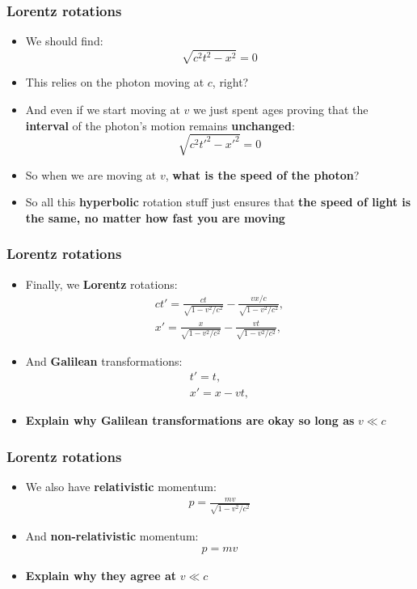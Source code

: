 \documentclass{beamer}
\begin{document}
\begin{frame}
  \frametitle{Lorentz rotations}
  \begin{itemize}
    \item<1-> We should find:
      \begin{equation*}
	\sqrt{c^2t^2-x^2}=0
      \end{equation*}
    \item<2-> This relies on the photon moving at $c$, right?
    \item<3-> And even if we start moving at $v$ we just spent ages proving that the \textbf{interval} of the photon's motion remains \textbf{unchanged}:
      \begin{equation*}
	\sqrt{c^2t'^2-x'^2}=0
      \end{equation*}
    \item<4-> So when we are moving at $v$, \textbf{what is the speed of the photon}?
    \item<5-> So all this \textbf{hyperbolic} rotation stuff just ensures that \textbf{the speed of light is the same, no matter how fast you are moving}
  \end{itemize}
\end{frame}

\begin{frame}
  \frametitle{Lorentz rotations}
  \begin{itemize}
    \item<1-> Finally, we \textbf{Lorentz} rotations:
      \begin{gather*}
	ct'=\frac{ct}{\sqrt{1-v^2/c^2}}-\frac{vx/c}{\sqrt{1-v^2/c^2}},\\
	x'=\frac{x}{\sqrt{1-v^2/c^2}}-\frac{vt}{\sqrt{1-v^2/c^2}},
      \end{gather*}
    \item<2-> And \textbf{Galilean} transformations:
      \begin{gather*}
	t'=t,\\
	x'=x-vt,
      \end{gather*}
    \item<3-> \textbf{Explain why Galilean transformations are okay so long as} $v\ll c$
  \end{itemize}
\end{frame}

\begin{frame}
  \frametitle{Lorentz rotations}
  \begin{itemize}
    \item<1-> We also have \textbf{relativistic} momentum:
      \begin{gather*}
	p=\frac{mv}{\sqrt{1-v^2/c^2}}
      \end{gather*}
    \item<2-> And \textbf{non-relativistic} momentum:
      \begin{gather*}
	p=mv
      \end{gather*}
    \item<3-> \textbf{Explain why they agree at} $v\ll c$
  \end{itemize}
\end{frame}
\end{document}
